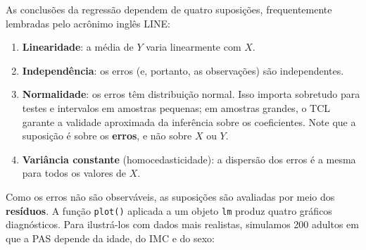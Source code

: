 \documentclass[
]{book}
\providecommand{\tightlist}{%
  \setlength{\itemsep}{0pt}\setlength{\parskip}{0pt}}
\begin{document}
As conclusões da regressão dependem de quatro suposições, frequentemente lembradas pelo acrônimo inglês LINE:

\begin{enumerate}
\def\labelenumi{\arabic{enumi}.}
\tightlist
\item
  \textbf{Linearidade}: a média de \(Y\) varia linearmente com \(X\).
\item
  \textbf{Independência}: os erros (e, portanto, as observações) são independentes.
\item
  \textbf{Normalidade}: os erros têm distribuição normal. Isso importa sobretudo para testes e intervalos em amostras pequenas; em amostras grandes, o TCL garante a validade aproximada da inferência sobre os coeficientes. Note que a suposição é sobre os \textbf{erros}, e não sobre \(X\) ou \(Y\).
\item
  \textbf{Variância constante} (homocedasticidade): a dispersão dos erros é a mesma para todos os valores de \(X\).
\end{enumerate}

Como os erros não são observáveis, as suposições são avaliadas por meio dos \textbf{resíduos}. A função \texttt{plot()} aplicada a um objeto \texttt{lm} produz quatro gráficos diagnósticos. Para ilustrá-los com dados mais realistas, simulamos 200 adultos em que a PAS depende da idade, do IMC e do sexo:
\end{document}
